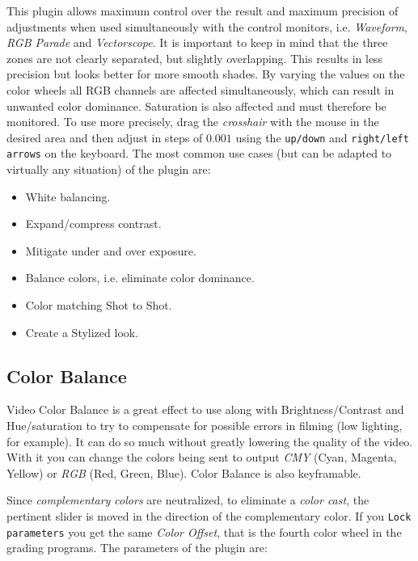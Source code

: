This plugin allows maximum control over the result and maximum precision of adjustments when used simultaneously with the control monitors, i.e. \textit{Waveform}, \textit{RGB Parade} and \textit{Vectorscope}. It is important to keep in mind that the three zones are not clearly separated, but slightly overlapping. This results in less precision but looks better for more smooth shades. By varying the values on the color wheels all RGB channels are affected simultaneously, which can result in unwanted color dominance. Saturation is also affected and must therefore be monitored.
To use more precisely, drag the \textit{crosshair} with the mouse in the desired area and then adjust in steps of $0.001$ using the \texttt{up/down} and \texttt{right/left arrows} on the keyboard.
The most common use cases (but can be adapted to virtually any situation) of the plugin are:

\begin{itemize}
    \item White balancing.
    \item Expand/compress contrast.
    \item Mitigate under and over exposure.
    \item Balance colors, i.e. eliminate color dominance.
    \item Color matching Shot to Shot.
    \item Create a Stylized look.
\end{itemize}

\subsection{Color Balance}%
\label{sub:color_balance}

Video Color Balance is a great effect to use along with Brightness/Contrast and Hue/saturation to try to compensate for possible errors in filming (low lighting, for example). It can do so much without greatly lowering the quality of the video. With it you can change the colors being sent to output \textit{CMY} (Cyan, Magenta, Yellow) or \textit{RGB} (Red, Green, Blue). Color Balance is also keyframable.

Since \textit{complementary colors} are neutralized, to eliminate a \textit{color cast}, the pertinent slider is moved in the direction of the complementary color. If you \texttt{Lock parameters} you get the same \textit{Color Offset}, that is the fourth color wheel in the grading programs. The parameters of the plugin are:

